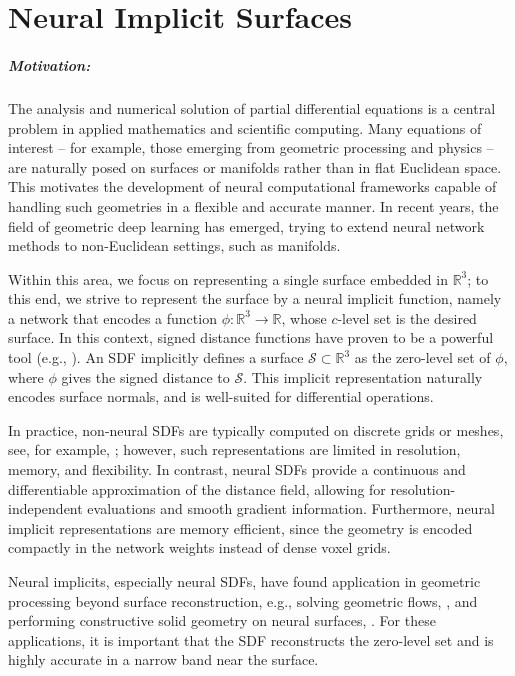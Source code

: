 \documentclass[12pt,openany]{book}
\newcommand{\R}{\mathbb{R}}
\def\S{\mathcal{S}}
\theoremstyle{plainnormal}
\theoremstyle{remark}
\begin{document}
\chapter{Neural Implicit Surfaces}\label{SectionNeuralImplicitSurf}
\paragraph*{Motivation:} 
The analysis and numerical solution of partial differential equations is a central problem in applied mathematics and scientific computing. Many equations of interest -- for example, those emerging from geometric processing and physics -- are naturally posed on surfaces or manifolds rather than in flat Euclidean space. This motivates the development of neural computational frameworks capable of handling such geometries in a flexible and accurate manner. In recent years, the field of geometric deep learning has emerged, trying to extend neural network methods to non-Euclidean settings, such as manifolds. \par
Within this area, we focus on representing a single surface embedded in $\R^3$; to this end, we strive to represent the surface by a neural implicit function, namely a network that encodes a function $\phi:\R^3\rightarrow\R$, whose $c$-level set is the desired surface. In this context, signed distance functions have proven to be a powerful tool (e.g., \cite{jiang2022sdfdiffdifferentiablerenderingsigned,survey_SDFs}). An SDF implicitly defines a surface $\mathcal S \subset \R^3$ as the zero-level set of $\phi$, where $\phi$ gives the signed distance to $\S$. This implicit representation naturally encodes surface normals, and is well-suited for differential operations.\par
In practice, non-neural SDFs are typically computed on discrete grids or meshes, see, for example, \cite{FengCrane}; however, such representations are limited in resolution, memory, and flexibility. In contrast, neural SDFs provide a continuous and differentiable approximation of the distance field, allowing for resolution-independent evaluations and smooth gradient information. Furthermore, neural implicit representations are memory efficient, since the geometry is encoded compactly in the network weights instead of dense voxel grids.\par
Neural implicits, especially neural SDFs, have found application in geometric processing beyond surface reconstruction, e.g., solving geometric flows, \cite{mehta2022levelsettheoryneural}, and performing constructive solid geometry on neural surfaces, \cite{marschner2023constructive}.  For these applications, it is important that the SDF reconstructs the zero-level set and is highly accurate in a narrow band near the surface.\par
\end{document}

